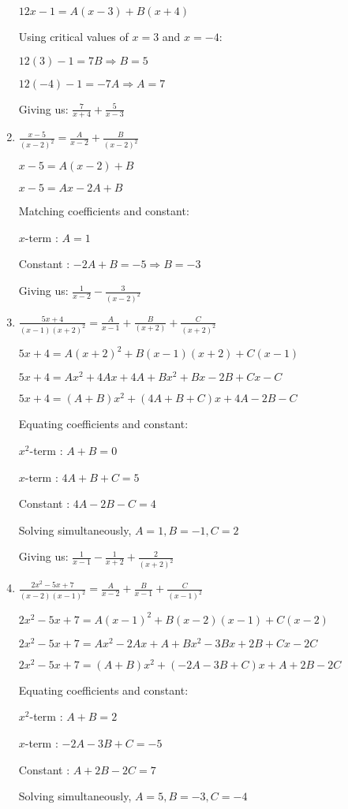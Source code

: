 \documentclass[../main.tex]{subfiles}
\begin{document}
\begin{enumerate}[itemsep=0.7cm]
    $12x-1=A(x-3)+B(x+4)$

    Using critical values of $x=3$ and $x=-4$:

    $12(3)-1=7B \Rightarrow B=5$

    $12(-4)-1=-7A \Rightarrow A=7$

    Giving us: $\frac{7}{x+4}+\frac{5}{x-3}$

    \item 
    $\frac{x-5}{(x-2)^2}=\frac{A}{x-2}+\frac{B}{(x-2)^2}$

    $x-5=A(x-2)+B$

    $x-5=Ax-2A+B$

    Matching coefficients and constant:

    $x$-term : $A=1$

    Constant : $-2A+B=-5 \Rightarrow B=-3$

    Giving us: $\frac{1}{x-2}-\frac{3}{(x-2)^2}$

    \item 
    $\frac{5x+4}{(x-1)(x+2)^2}=\frac{A}{x-1}+\frac{B}{(x+2)}+\frac{C}{(x+2)^2}$

    $5x+4=A(x+2)^2+B(x-1)(x+2)+C(x-1)$

    $5x+4=Ax^2+4Ax+4A+Bx^2+Bx-2B+Cx-C$

    $5x+4=(A+B)x^2+(4A+B+C)x+4A-2B-C$

    Equating coefficients and constant:

    $x^2$-term : $A+B=0$

    $x$-term : $4A+B+C=5$

    Constant : $4A-2B-C=4$

    Solving simultaneously, $A=1,B=-1, C=2$

    Giving us: $\frac{1}{x-1}-\frac{1}{x+2}+\frac{2}{(x+2)^2}$

    \item 
    $\frac{2x^2-5x+7}{(x-2)(x-1)^2}=\frac{A}{x-2}+\frac{B}{x-1}+\frac{C}{(x-1)^2}$

    $2x^2-5x+7=A(x-1)^2+B(x-2)(x-1)+C(x-2)$

    $2x^2-5x+7=Ax^2-2Ax+A+Bx^2-3Bx+2B+Cx-2C$

    $2x^2-5x+7=(A+B)x^2+(-2A-3B+C)x+A+2B-2C$

    Equating coefficients and constant:

    $x^2$-term : $A+B=2$

    $x$-term : $-2A-3B+C=-5$

    Constant : $A+2B-2C=7$

    Solving simultaneously, $A=5, B=-3, C=-4$


\end{enumerate}
\end{document}
